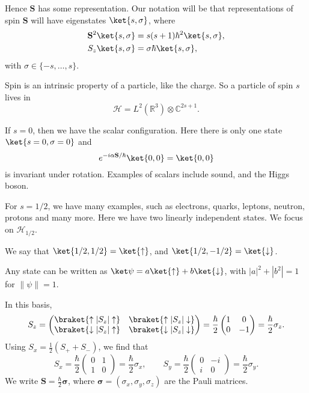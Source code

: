 \documentclass[12pt]{article}
\begin{document}
Hence $\mathbf{S}$ has some representation. Our notation will be that representations of spin $\mathbf{S}$ will have eigenstates $\ket{s, \sigma}$, where
\begin{align*}
	\mathbf{S}^2 \ket{s, \sigma} &= s(s+1)\hbar^2 \ket{s, \sigma}, \\
	S_z\ket{s, \sigma} &= \sigma \hbar \ket{s, \sigma},
\end{align*}
with $\sigma \in \{-s, \ldots, s\}$.

Spin is an intrinsic property of a particle, like the charge. So a particle of spin $s$ lives in
\[
\mathcal{H} = L^2(\mathbb{R}^3) \otimes \mathbb{C}^{2s+1}.
\]

If $s = 0$, then we have the scalar configuration. Here there is only one state $\ket{s = 0, \sigma = 0}$ and
\[
	e^{-i\alpha \mathbf{S}/\hbar} \ket{0,0} = \ket{0,0}
\]
is invariant under rotation. Examples of scalars include sound, and the Higgs boson.

For $s = 1/2$, we have many examples, such as electrons, quarks, leptons, neutron, protons and many more. Here we have two linearly independent states. We focus on $\mathcal{H}_{1/2}$.

We say that $\ket{1/2, 1/2} = \ket{\uparrow}$, and $\ket{1/2,-1/2} = \ket{\downarrow}$.

Any state can be written as $\ket \psi = a \ket{\uparrow} + b \ket{\downarrow}$, with $|a|^2 + |b^2| = 1$ for $\|\psi\| = 1$.

In this basis,
\[
S_z =
\begin{pmatrix}
	\braket{\uparrow|S_z|\uparrow}& \braket{\uparrow|S_z|\downarrow} \\
	\braket{\downarrow|S_z|\uparrow} & \braket{\downarrow|S_z|\downarrow}
\end{pmatrix}
=\frac{\hbar}{2}
\begin{pmatrix}
	1&0\\0&-1
\end{pmatrix}
=\frac{\hbar}{2}\sigma_z.
\]
Using $S_x = \frac{1}{2} (S_+ + S_-)$, we find that
\[
S_x = \frac{\hbar}{2}
\begin{pmatrix}
	0&1\\1&0
\end{pmatrix}
=\frac{\hbar}{2}\sigma_x, \qquad S_y = \frac{\hbar}{2}
\begin{pmatrix}
	0&-i\\i&0
\end{pmatrix}
=\frac{\hbar}{2}\sigma_y.
\]
We write $\mathbf{S} = \frac{\hbar}{2} \bm{\sigma}$, where $\bm{\sigma} = (\sigma_x, \sigma_y, \sigma_z)$ are the Pauli matrices.
\end{document}
